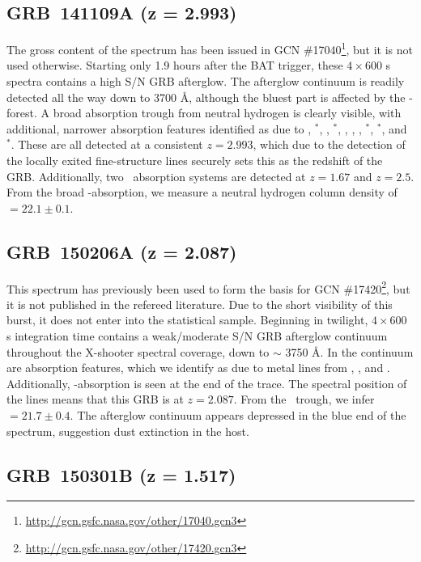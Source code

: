 \documentclass{aa}    %
\begin{document}
\subsection{GRB~141109A (z = 2.993)}	

The gross content of the spectrum has been issued in GCN
\#17040\footnote{\url{http://gcn.gsfc.nasa.gov/other/17040.gcn3}}, but it is not
used otherwise. Starting only 1.9 hours after the BAT trigger, these
$4\times600$ s spectra contains a high S/N GRB afterglow. The afterglow
continuum is readily detected all the way down to 3700 \AA, although the bluest
part is affected by the \lya-forest. A broad absorption trough from neutral
hydrogen is clearly visible, with additional, narrower absorption features
identified as due to \SIii, \SIii$^*$, \cii, \cii$^*$, \SIiv, \civ, \feii,
\feii$^*$, \oi$^*$, and \nii$^*$. These are all detected at a consistent $z =
2.993$, which due to the detection of the locally exited fine-structure lines
securely sets this as the redshift of the GRB. Additionally, two
\mgii~absorption systems are detected at $z = 1.67$ and $z=2.5$. From the broad
\lya-absorption, we measure a neutral hydrogen column density of \nh~$=22.1 \pm
0.1$.

\subsection{GRB~150206A (z = 2.087)}	

This spectrum has previously been used to form the basis for GCN
\#17420\footnote{\url{http://gcn.gsfc.nasa.gov/other/17420.gcn3}}, but it is not
published in the refereed literature. Due to the short visibility of this burst,
it does not enter into the statistical sample. Beginning in twilight,
$4\times600$ s integration time contains a weak/moderate S/N GRB afterglow
continuum throughout the X-shooter spectral coverage, down to $\sim$ 3750 \AA.
In the continuum are absorption features, which we identify as due to metal
lines from \znii, \feii, and \mgii. Additionally, \lya-absorption is seen at the
end of the trace. The spectral position of the lines means that this GRB is at
$z = 2.087$. From the \lya~trough, we infer \nh~$=21.7 \pm 0.4$. The afterglow
continuum appears depressed in the blue end of the spectrum, suggestion dust
extinction in the host.

\subsection{GRB~150301B (z = 1.517)}	
\end{document}
